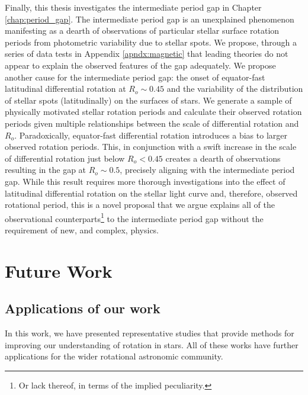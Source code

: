 Finally, this thesis investigates the intermediate period gap in Chapter \ref{chap:period_gap}.
The intermediate period gap is an unexplained phenomenon manifesting as a dearth of observations of particular stellar surface rotation periods from photometric variability due to stellar spots.
We propose, through a series of data tests in Appendix \ref{apndx:magnetic} that leading theories do not appear to explain the observed features of the gap adequately. 
We propose another cause for the intermediate period gap: the onset of equator-fast latitudinal differential rotation at $R_o \sim 0.45$ and the variability of the distribution of stellar spots (latitudinally) on the surfaces of stars.
We generate a sample of physically motivated stellar rotation periods and calculate their observed rotation periods given multiple relationships between the scale of differential rotation and $R_o$.
Paradoxically, equator-fast differential rotation introduces a bias to larger observed rotation periods.
This, in conjunction with a swift increase in the scale of differential rotation just below $R_o <  0.45$ creates a dearth of observations resulting in the gap at $R_o \sim 0.5$, precisely aligning with the intermediate period gap.
While this result requires more thorough investigations into the effect of latitudinal differential rotation on the stellar light curve and, therefore, observed rotational period, this is a novel proposal that we argue explains all of the observational counterparts\footnote{Or lack thereof, in terms of the implied peculiarity.} to the intermediate period gap without the requirement of new, and complex, physics.

\section{Future Work}

\subsection{Applications of our work}

In this work, we have presented representative studies that provide methods for improving our understanding of rotation in stars.
All of these works have further applications for the wider rotational astronomic community.

